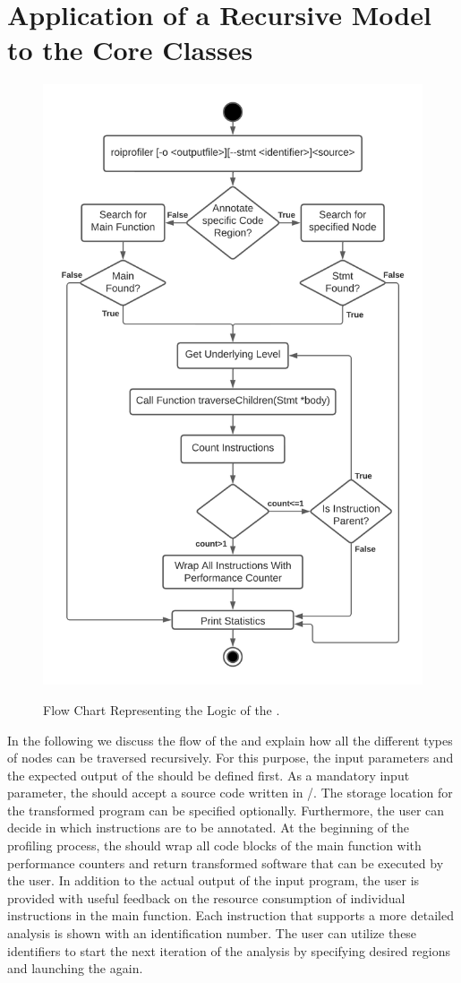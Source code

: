 \section{Application of a Recursive Model to the Core Classes}
\begin{figure}[p]
    \centering
    \caption{Flow Chart Representing the Logic of the \TOOL.} 
    \includegraphics[width=.75\textwidth]{graphics/c_flow_chart.png}
    \label{fig:c:flow_chart}
\end{figure}

In the following we discuss the flow of the \TOOL and explain how all the different types of nodes can be traversed recursively. For this purpose, the input parameters and the expected output of the \TOOL should be defined first. As a mandatory input parameter, the \TOOL should accept a source code written in \C /\CPP. The storage location for the transformed program can be specified optionally. Furthermore, the user can decide in which \roismall instructions are to be annotated. At the beginning of the profiling process, the \TOOL should wrap all code blocks of the main function with performance counters and return transformed software that can be executed by the user. In addition to the actual output of the input program, the user is provided with useful feedback on the resource consumption of individual instructions in the main function. Each instruction that supports a more detailed analysis is shown with an identification number. The user can utilize these identifiers to start the next iteration of the analysis by specifying desired regions and launching the \TOOL again. 


